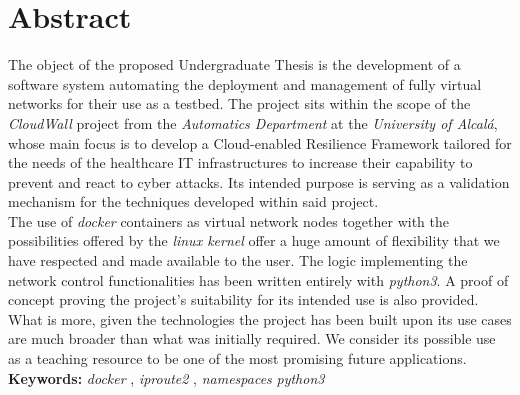 \chapter*{Abstract}
    \thispagestyle{empty}

    The object of the proposed Undergraduate Thesis is the development of a software system automating the deployment and management of fully virtual networks for their use as a testbed. The project sits within the scope of the \textit{CloudWall} \cite{bib:react} project from the \textit{Automatics Department} at the \textit{University of Alcalá}, whose main focus is to develop a Cloud-enabled Resilience Framework tailored for the needs of the healthcare IT infrastructures to increase their capability to prevent and react to cyber attacks. Its intended purpose is serving as a validation mechanism for the techniques developed within said project.\\

    The use of \textit{docker} containers as virtual network nodes together with the possibilities offered by the \textit{linux kernel} offer a huge amount of flexibility that we have respected and made available to the user. The logic implementing the network control functionalities has been written entirely with \textit{python3}. A proof of concept proving the project's suitability for its intended use is also provided. What is more, given the technologies the project has been built upon its use cases are much broader than what was initially required. We consider its possible use as a teaching resource to be one of the most promising future applications.\\

    \textbf{Keywords:} \textit{docker} \cite{bib:docker}, \textit{iproute2} \cite{bib:man-ip}, \textit{namespaces} \cite{bib:man-namespaces} \textit{python3} \cite{bib:python}
